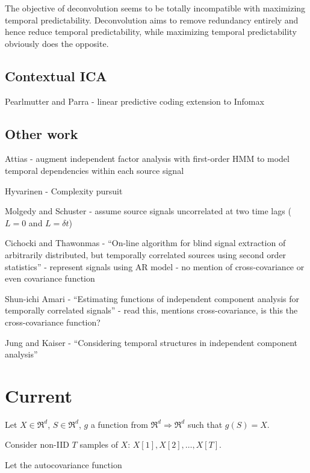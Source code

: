 \documentclass{article}
\begin{document}
  The objective of deconvolution seems to be totally incompatible with maximizing temporal predictability. Deconvolution aims to remove redundancy entirely and hence reduce temporal predictability, while maximizing temporal predictability obviously does the opposite.
  
  \subsection{Contextual ICA}
  Pearlmutter and Parra - linear predictive coding extension to Infomax
  
  \subsection{Other work}

  Attias - augment independent factor analysis with first-order HMM to model temporal dependencies within each source signal
  
  Hyvarinen - Complexity pursuit
  
  Molgedy and Schuster - assume source signals uncorrelated at two time lags ($L=0$ and $L=\delta t$)
  
  Cichocki and Thawonmas - ``On-line algorithm for blind signal extraction of arbitrarily distributed, but temporally correlated sources using second order statistics'' - represent signals using AR model - no mention of cross-covariance or even covariance function
  
  Shun-ichi Amari - ``Estimating functions of independent component analysis for temporally correlated signals'' - read this, mentions cross-covariance, is this the cross-covariance function?
  
  Jung and Kaiser - ``Considering temporal structures in independent component analysis''
  
  \section{Current}
  
  Let $X \in \mathfrak{R}^d$, $S \in \mathfrak{R}^d$, $g$ a function from $\mathfrak{R}^d \Rightarrow \mathfrak{R}^d$ such that $g(S) = X$.
  
  Consider non-IID $T$ samples of $X$: $X[1], X[2], \ldots, X[T]$.
  
  Let the autocovariance function

  
  
  
  
\end{document}
